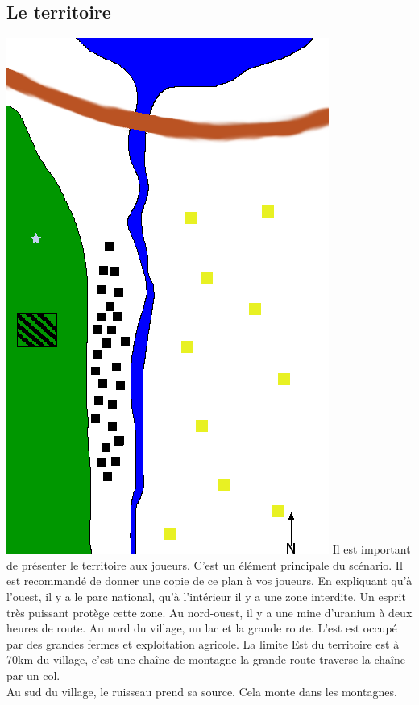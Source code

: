 \documentclass[oneside,12pt]{book}
\begin{document}
\begin{flushleft}
\subsection{Le territoire}
\includegraphics{plan.png}
Il est important de présenter le territoire aux joueurs.
C'est un élément principale du scénario. Il est recommandé de donner une copie de ce plan à vos joueurs. En expliquant qu'à l'ouest, il y a le parc national, qu'à l'intérieur il y a une zone interdite. Un esprit très puissant protège cette zone. Au nord-ouest, il y a une mine d'uranium à deux heures de route. Au nord du village, un lac et la grande route. L'est est occupé par des grandes fermes et exploitation agricole. La limite Est du territoire est à 70km du  village, c'est une chaîne de montagne la grande route traverse la chaîne par un col. \\
Au sud du village, le ruisseau prend sa source. Cela monte dans les montagnes. \\

\end{flushleft}
\end{document}
